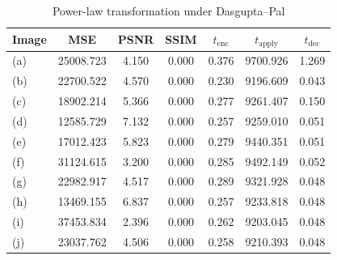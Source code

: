 \begin{table}[h]
	\centering
	\caption{Power-law transformation under Dasgupta--Pal}
	\label{tbl:pwr-dp}
    \begin{tabular}{lcccccc}
        \toprule
        Image & MSE  & PSNR & SSIM & $t_\text{enc}$ & $t_\text{apply}$ & $t_\text{dec}$ \\ \midrule
		(a) & 25008.723 & 4.150 & 0.000 & 0.376 & 9700.926 & 1.269 \\
		(b) & 22700.522 & 4.570 & 0.000 & 0.230 & 9196.609 & 0.043 \\
		(c) & 18902.214 & 5.366 & 0.000 & 0.277 & 9261.407 & 0.150 \\
		(d) & 12585.729 & 7.132 & 0.000 & 0.257 & 9259.010 & 0.051 \\
		(e) & 17012.423 & 5.823 & 0.000 & 0.279 & 9440.351 & 0.051 \\
		(f) & 31124.615 & 3.200 & 0.000 & 0.285 & 9492.149 & 0.052 \\
		(g) & 22982.917 & 4.517 & 0.000 & 0.289 & 9321.928 & 0.048 \\
		(h) & 13469.155 & 6.837 & 0.000 & 0.257 & 9233.818 & 0.048 \\
		(i) & 37453.834 & 2.396 & 0.000 & 0.262 & 9203.045 & 0.048 \\
		(j) & 23037.762 & 4.506 & 0.000 & 0.258 & 9210.393 & 0.048 \\
		\bottomrule
        \end{tabular}
\end{table}



